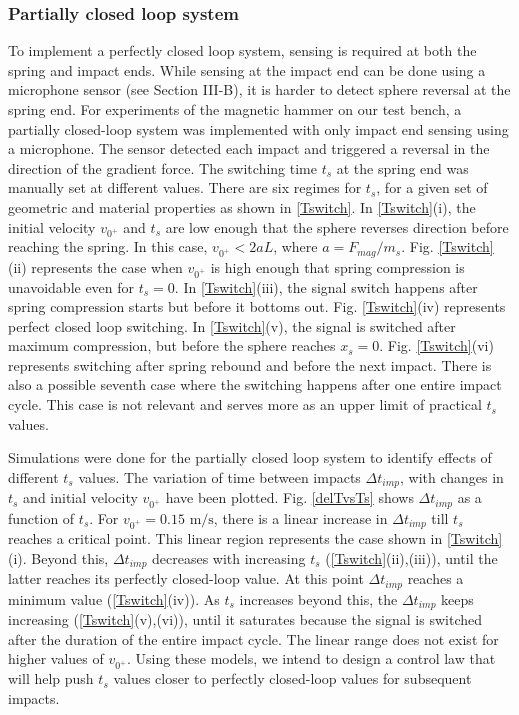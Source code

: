 \documentclass[letterpaper, 10 pt, conference]{ieeeconf}  %
\begin{document}
\subsubsection{Partially closed loop system}
\label{pcl}

To implement a perfectly closed loop system, sensing is required at both the spring and impact ends. While sensing at the impact end can be done using a microphone sensor (see Section III-B), it is harder to detect sphere reversal at the spring end. For experiments of the magnetic hammer on our test bench, a partially closed-loop system was implemented with only impact end sensing using a microphone. The sensor detected each impact and triggered a reversal in the direction of the gradient force. The switching time $t_s$ at the spring end was manually set at different values. There are six regimes for $t_s$, for a given set of geometric and material properties as shown in \cref{Tswitch}. In \cref{Tswitch}(i), the initial velocity $v_{0^+}$ and $t_s$ are low enough that the sphere reverses direction before reaching the spring. In this case, $v_{0^+} < 2aL$, where $a=F_{mag}/m_s$. Fig. \ref{Tswitch}(ii) represents the case when $v_{0^+}$ is high enough that spring compression is unavoidable even for $t_s = 0$. In \cref{Tswitch}(iii), the signal switch happens after spring compression starts but before it bottoms out. Fig. \ref{Tswitch}(iv) represents perfect closed loop switching. In \cref{Tswitch}(v), the signal is switched after maximum compression, but before the sphere reaches $x_s=0$. Fig. \ref{Tswitch}(vi) represents switching after spring rebound and before the next impact. There is also a possible seventh case where the switching happens after one entire impact cycle. This case is not relevant and serves more as an upper limit of practical $t_s$ values. 

Simulations were done for the partially closed loop system to identify effects of different $t_s$ values. The variation of time between impacts $\Delta t_{imp}$, with changes in $t_s$ and initial velocity $v_{0^+}$ have been plotted. Fig. \ref{delTvsTs} shows $\Delta t_{imp}$ as a function of $t_s$. For $v_{0^+}=0.15\text{ m/s}$, there is a linear increase in $\Delta t_{imp}$ till $t_s$ reaches a critical point. This linear region represents the case shown in \cref{Tswitch}(i). Beyond this, $\Delta t_{imp}$ decreases with increasing $t_s$ (\cref{Tswitch}(ii),(iii)), until the latter reaches its perfectly closed-loop value. At this point $\Delta t_{imp}$ reaches a minimum value (\cref{Tswitch}(iv)). As $t_s$ increases beyond this, the $\Delta t_{imp}$ keeps increasing (\cref{Tswitch}(v),(vi)), until it saturates because the signal is switched after the duration of the entire impact cycle. The linear range does not exist for higher values of $v_{0^+}$. Using these models, we intend to design a control law that will help push $t_s$ values closer to perfectly closed-loop values for subsequent impacts.
\end{document}
